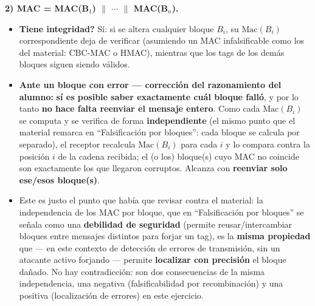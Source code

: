 \textbf{2) MAC = MAC(B$_1$) $\|$ $\cdots$ $\|$ MAC(B$_n$).}
\begin{itemize}
  \item \textbf{\textquestiondown{}Tiene integridad?} Sí: si se altera cualquier bloque $B_i$, su
  $\mathrm{Mac}(B_i)$ correspondiente deja de verificar (asumiendo un MAC infalsificable
  como los del material: CBC-MAC o HMAC), mientras que los tags de los demás bloques
  siguen siendo válidos.
  \item \textbf{Ante un bloque con error --- corrección del razonamiento del alumno:}
  \textbf{sí es posible saber exactamente cuál bloque falló}, y por lo tanto \textbf{no
  hace falta reenviar el mensaje entero}. Como cada $\mathrm{Mac}(B_i)$ se computa y se
  verifica de forma \textbf{independiente} (el mismo punto que el material remarca en
  ``Falsificación por bloques'': cada bloque se calcula por separado), el receptor
  recalcula $\mathrm{Mac}(B_i)$ para cada $i$ y lo compara contra la posición $i$ de la
  cadena recibida; el (o los) bloque(s) cuyo MAC no coincide son exactamente los que
  llegaron corruptos. Alcanza con \textbf{reenviar solo ese/esos bloque(s)}.
  \item Este es justo el punto que había que revisar contra el material: la
  independencia de los MAC por bloque, que en ``Falsificación por bloques'' se señala
  como una \textbf{debilidad de seguridad} (permite reusar/intercambiar bloques entre
  mensajes distintos para forjar un tag), es la \textbf{misma propiedad} que --- en este
  contexto de detección de errores de transmisión, sin un atacante activo forjando ---
  permite \textbf{localizar con precisión} el bloque dañado. No hay contradicción: son
  dos consecuencias de la misma independencia, una negativa (falsificabilidad por
  recombinación) y una positiva (localización de errores) en este ejercicio.
\end{itemize}

